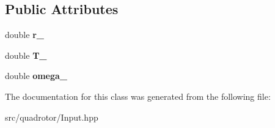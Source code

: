 \subsection*{\-Public \-Attributes}
\begin{DoxyCompactItemize}
\item 
\hypertarget{classInput_1_1Vec3_1_1Circle_a49ae5e8e06e3bfa8c66c98e13d89f706}{double {\bfseries r\-\_\-}}\label{classInput_1_1Vec3_1_1Circle_a49ae5e8e06e3bfa8c66c98e13d89f706}

\item 
\hypertarget{classInput_1_1Vec3_1_1Circle_a873c9bcd953193a827cfa9e92ea1740a}{double {\bfseries \-T\-\_\-}}\label{classInput_1_1Vec3_1_1Circle_a873c9bcd953193a827cfa9e92ea1740a}

\item 
\hypertarget{classInput_1_1Vec3_1_1Circle_a3dc1f92e4adb3f85ed7073d25e287cbc}{double {\bfseries omega\-\_\-}}\label{classInput_1_1Vec3_1_1Circle_a3dc1f92e4adb3f85ed7073d25e287cbc}

\end{DoxyCompactItemize}


\-The documentation for this class was generated from the following file\-:\begin{DoxyCompactItemize}
\item 
src/quadrotor/\-Input.\-hpp\end{DoxyCompactItemize}
